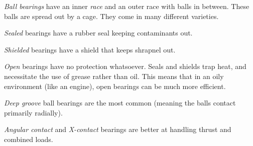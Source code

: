 \documentclass[10pt,letterpaper]{book}
\begin{document}
	\begin{asparaenum}[a)]
		\item \textit{Ball bearings} have an inner \textit{race} and an outer race with balls in between. These balls are spread out by a cage. They come in many different varieties.
		\begin{asparaitem}[\ \ \ ]
			\item \textit{Sealed} bearings have a rubber seal keeping contaminants out.
			\item \textit{Shielded} bearings have a shield that keeps shrapnel out.
			\item \textit{Open} bearings have no protection whatsoever. Seals and shields trap heat, and necessitate the use of grease rather than oil. This means that in an oily environment (like an engine), open bearings can be much more efficient.
			
			\item \textit{Deep groove} ball bearings are the most common (meaning the balls contact primarily radially).
			\item \textit{Angular contact} and \textit{X-contact} bearings are better at handling thrust and combined loads.
			

\end{asparaitem}
\end{asparaenum}
\end{document}
